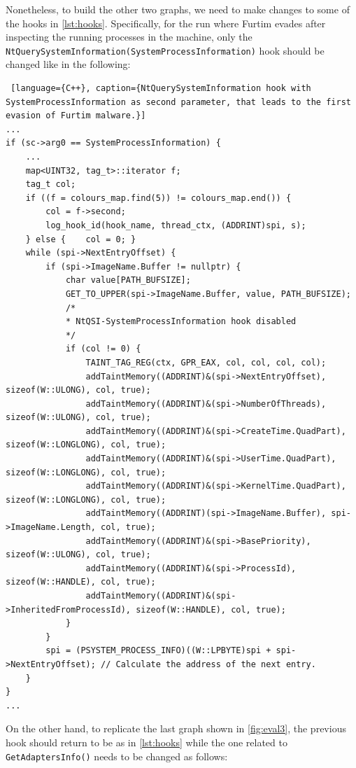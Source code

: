 \documentclass[LaM,binding=0.6cm]{sapthesis}
\begin{document}
Nonetheless, to build the other two graphs, we need to make changes to some of the hooks in \autoref{lst:hooks}. Specifically, for the run where Furtim evades after inspecting the running processes in the machine, only the \texttt{NtQuerySystemInformati\-on(SystemProcessInformation)} hook should be changed like in the following:
\begin{lstlisting} [language={C++}, caption={NtQuerySystemInformation hook with SystemProcessInformation as second parameter, that leads to the first evasion of Furtim malware.}]
...
if (sc->arg0 == SystemProcessInformation) {
	...
	map<UINT32, tag_t>::iterator f;
	tag_t col;
	if ((f = colours_map.find(5)) != colours_map.end()) {
		col = f->second;
		log_hook_id(hook_name, thread_ctx, (ADDRINT)spi, s);
	} else {	col = 0; }
	while (spi->NextEntryOffset) {
		if (spi->ImageName.Buffer != nullptr) {	
			char value[PATH_BUFSIZE];
			GET_TO_UPPER(spi->ImageName.Buffer, value, PATH_BUFSIZE);
			/*
			* NtQSI-SystemProcessInformation hook disabled
			*/
			if (col != 0) {
				TAINT_TAG_REG(ctx, GPR_EAX, col, col, col, col);
				addTaintMemory((ADDRINT)&(spi->NextEntryOffset), sizeof(W::ULONG), col, true);
				addTaintMemory((ADDRINT)&(spi->NumberOfThreads), sizeof(W::ULONG), col, true);
				addTaintMemory((ADDRINT)&(spi->CreateTime.QuadPart), sizeof(W::LONGLONG), col, true);
				addTaintMemory((ADDRINT)&(spi->UserTime.QuadPart), sizeof(W::LONGLONG), col, true);
				addTaintMemory((ADDRINT)&(spi->KernelTime.QuadPart), sizeof(W::LONGLONG), col, true);
				addTaintMemory((ADDRINT)(spi->ImageName.Buffer), spi->ImageName.Length, col, true);
				addTaintMemory((ADDRINT)&(spi->BasePriority), sizeof(W::ULONG), col, true);
				addTaintMemory((ADDRINT)&(spi->ProcessId), sizeof(W::HANDLE), col, true);
				addTaintMemory((ADDRINT)&(spi->InheritedFromProcessId), sizeof(W::HANDLE), col, true);	
			}
		}
		spi = (PSYSTEM_PROCESS_INFO)((W::LPBYTE)spi + spi->NextEntryOffset); // Calculate the address of the next entry.
	}
}
...
\end{lstlisting}
On the other hand, to replicate the last graph shown in \autoref{fig:eval3}, the previous hook should return to be as in \autoref{lst:hooks} while the one related to \texttt{GetAdaptersInfo()} needs to be changed as follows:
\end{document}
